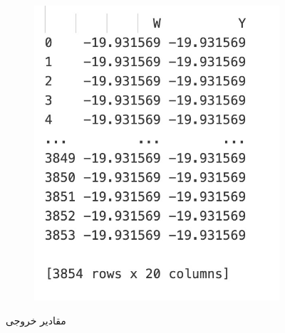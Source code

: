 \begin{figure}[H]
\begin{subfigure}[b]{0.4\textwidth}
                    \includegraphics[width=\textwidth]{images/pssm2.jpg}
                    \label{fig:pssm2}
                \end{subfigure}
                \caption{ مقادیر خروجی}
                \label{fig:pssm}
            \end{figure}

